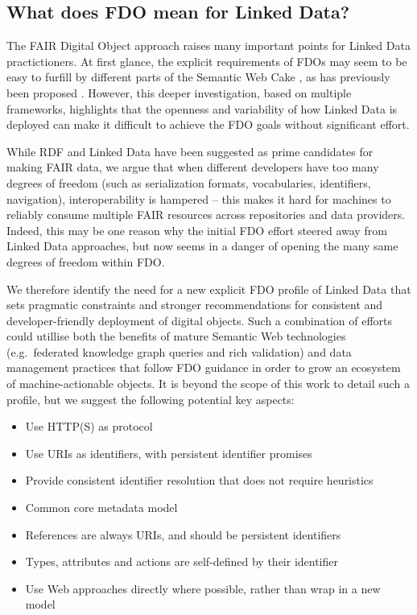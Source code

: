 \subsection{What does FDO mean for Linked Data?}\label{ch3:what-does-it-mean-for-linked-data}

The FAIR Digital Object approach raises many important points for Linked Data practictioners.
At first glance, the explicit requirements of FDOs may seem to be easy to furfill by different parts of the Semantic Web Cake \cite[slide 10]{SemanticWebXML2000}, as has previously been proposed \cite{10.3897/rio.8.e94501}.
However, this deeper investigation, based on multiple frameworks, highlights that the openness and variability of how Linked Data is deployed can make it difficult to achieve the FDO goals without significant effort.

While RDF and Linked Data have been suggested as prime candidates for making FAIR data, we argue that when different developers have too many degrees of freedom (such as serialization formats, vocabularies, identifiers, navigation), interoperability is hampered -- this makes it hard for machines to reliably consume multiple FAIR resources across repositories and data providers. 
Indeed, this may be one reason why the initial FDO effort steered away from Linked Data approaches, but now seems in a danger of opening the many same degrees of freedom within FDO.

We therefore identify the need for a new explicit FDO profile of Linked Data that sets pragmatic constraints and stronger recommendations for consistent and developer-friendly deployment of digital objects. 
Such a combination of efforts could utillise both the benefits of mature Semantic Web technologies (e.g.~federated knowledge graph queries and rich validation) and data management practices that follow FDO guidance in order to grow an ecosystem of machine-actionable objects. 
It is beyond the scope of this work to detail such a profile, but we suggest the following potential key aspects:

\begin{itemize}
  \item Use HTTP(S) as protocol
  \item Use URIs as identifiers, with persistent identifier promises
  \item Provide consistent identifier resolution that does not require heuristics
  \item Common core metadata model
  \item References are always URIs, and should be persistent identifiers
  \item Types, attributes and actions are self-defined by their identifier
  \item Use Web approaches directly where possible, rather than wrap in a new model
\end{itemize}

